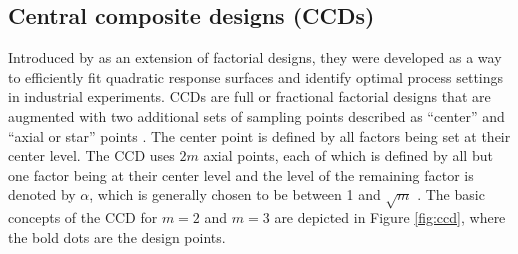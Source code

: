 \documentclass [PhD] {package/uclathes}
\begin{document}
\subsection*{Central composite designs (CCDs)}
Introduced by \textcite{box1951series} as an extension of factorial designs, they were developed as a way to efficiently fit quadratic response surfaces and identify optimal process settings in industrial experiments. CCDs are full or fractional factorial designs that are augmented with two additional sets of sampling points described as ``center'' and ``axial or star'' points \parencite{box1951series}. The center point is defined by all factors being set at their center level. The CCD uses $2m$ axial points, each of which is defined by all but one factor being at their center level and the level of the remaining factor is denoted by $\alpha$, which is generally chosen to be between 1 and $\sqrt{m}$ \parencite{montgomery2017design}. The basic concepts of the CCD for $m = 2$ and $m = 3$ are depicted in Figure \ref{fig:ccd}, where the bold dots are the design points.
\end{document}
